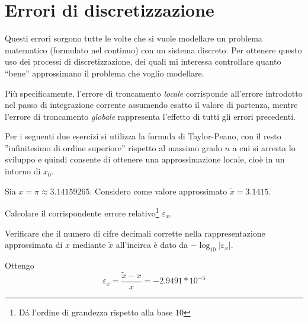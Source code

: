\section{Errori di discretizzazione} 

Questi errori sorgono tutte le volte che si vuole modellare un problema 
matematico (formulato nel continuo) con un sistema discreto. Per ottenere 
questo uso dei processi di discretizzazione, dei quali mi interessa controllare
quanto ``bene'' approssimano il problema che voglio modellare.

Pi\`u specificamente, l'errore di troncamento \emph{locale} corrisponde 
all'errore introdotto nel passo di integrazione corrente assumendo esatto il 
valore di partenza, mentre l'errore di troncamento \emph{globale} rappresenta 
l'effetto di tutti gli errori precedenti.

Per i seguenti due esercizi si utilizza la formula di Taylor-Peano, con il 
resto ''infinitesimo di ordine superiore'' rispetto al massimo grado $n$ a cui 
si arresta lo sviluppo e quindi consente di ottenere una approssimazione
locale, cioè in un intorno di $x_{0}$.

\begin{exercise}[1.1]
	Sia $x = \pi \approx 3.14159265$. Considero come valore approssimato 
	$\tilde{x} = 3.1415$. 
	
	Calcolare il corrispondente errore relativo\footnote{D\'a l'ordine di 
	grandezza rispetto alla base $10$} $\varepsilon_{x}$. 
	
	Verificare che il numero di cifre decimali corrette nella rappresentazione 
	approssimata di $x$ mediante $\tilde{x}$ all'incirca \`e dato da $-\log_{10}
	{|\varepsilon_{x}|}$.
\end{exercise}
Ottengo $$\varepsilon_{x} = \frac{\tilde{x}-x}{x} = -2.9491*10^{-5}$$


